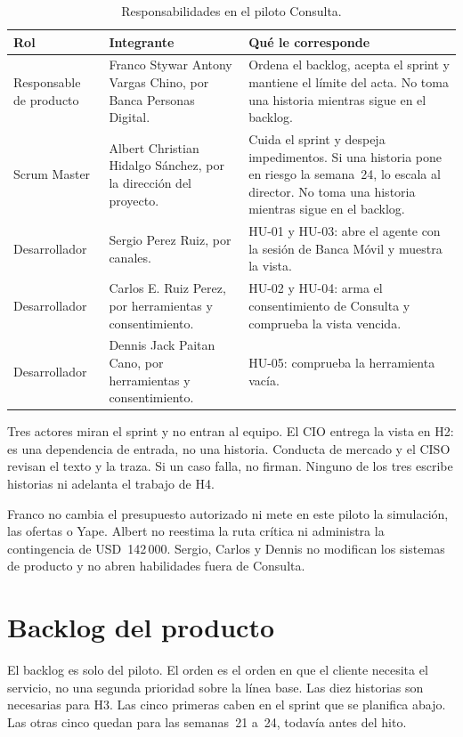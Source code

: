 \documentclass[11pt,a4paper]{article}
\newcommand{\usd}[1]{USD~#1}
\begin{document}
\begin{table}[H]
\centering
\caption{Responsabilidades en el piloto Consulta.}
\small
\begin{tabularx}{\textwidth}{@{}>{\raggedright\arraybackslash}p{2.55cm} >{\raggedright\arraybackslash}X >{\raggedright\arraybackslash}X@{}}
\toprule
\textbf{Rol} & \textbf{Integrante} & \textbf{Qué le corresponde} \\
\midrule
Responsable de producto & Franco Stywar Antony Vargas Chino, por Banca Personas Digital. & Ordena el backlog, acepta el sprint y mantiene el límite del acta. No toma una historia mientras sigue en el backlog. \\
Scrum Master & Albert Christian Hidalgo Sánchez, por la dirección del proyecto. & Cuida el sprint y despeja impedimentos. Si una historia pone en riesgo la semana~24, lo escala al director. No toma una historia mientras sigue en el backlog. \\
Desarrollador & Sergio Perez Ruiz, por canales. & HU-01 y HU-03: abre el agente con la sesión de Banca Móvil y muestra la vista. \\
Desarrollador & Carlos E. Ruiz Perez, por herramientas y consentimiento. & HU-02 y HU-04: arma el consentimiento de Consulta y comprueba la vista vencida. \\
Desarrollador & Dennis Jack Paitan Cano, por herramientas y consentimiento. & HU-05: comprueba la herramienta vacía. \\
\bottomrule
\end{tabularx}
\end{table}

Tres actores miran el sprint y no entran al equipo. El CIO entrega la vista en H2: es una dependencia de entrada, no una historia. Conducta de mercado y el CISO revisan el texto y la traza. Si un caso falla, no firman. Ninguno de los tres escribe historias ni adelanta el trabajo de H4.

Franco no cambia el presupuesto autorizado ni mete en este piloto la simulación, las ofertas o Yape. Albert no reestima la ruta crítica ni administra la contingencia de \usd{142\,000}. Sergio, Carlos y Dennis no modifican los sistemas de producto y no abren habilidades fuera de Consulta.

\section{Backlog del producto}

El backlog es solo del piloto. El orden es el orden en que el cliente necesita el servicio, no una segunda prioridad sobre la línea base. Las diez historias son necesarias para H3. Las cinco primeras caben en el sprint que se planifica abajo. Las otras cinco quedan para las semanas~21 a~24, todavía antes del hito.
\end{document}
